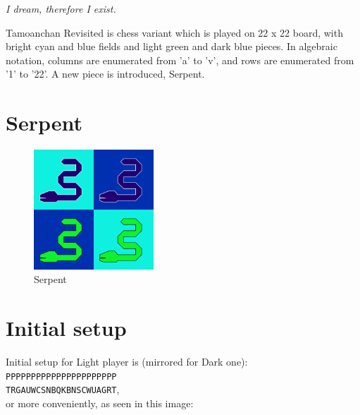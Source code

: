 \documentclass[a5paper,12pt,draft]{book} %
\begin{document}
\begin{flushright}
\parbox{0.6\textwidth}{
\emph{I dream, therefore I exist. \\
 } }
\end{flushright}

\noindent
Tamoanchan Revisited is chess variant which is played on 22 x 22 board,
with bright cyan and blue fields and light green and dark blue pieces.
In algebraic notation, columns are enumerated from 'a' to 'v', and rows
are enumerated from '1' to '22'. A new piece is introduced, Serpent.

\clearpage

\section*{Serpent}

\noindent
\begin{figure}
\includegraphics[width=0.4\textwidth, keepaspectratio=true]{../gfx/pieces/13_serpent.png}
\caption{Serpent}
\label{fig:serpent}
\end{figure}

\clearpage

\section*{Initial setup}

Initial setup for Light player is (mirrored for Dark one):
\texttt{PPPPPPPPPPPPPPPPPPPPPP \\
        TRGAUWCSNBQKBNSCWUAGRT}, \\
or more conveniently, as seen in this image:
\end{document}
